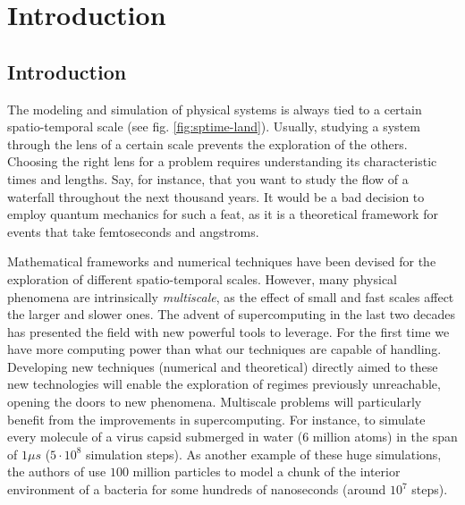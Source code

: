 \documentclass[ twoside,openright,titlepage,numbers=noenddot,%
headinclude,footinclude,cleardoublepage=empty,abstract=on,
BCOR=5mm,paper=a4,fontsize=11pt, dvipsnames
]{scrreprt}
\begin{document}
    \vspace{8ex}

    \printglossary[type=\acronymtype,nonumberlist]
\endgroup
\glsresetall
\newpage
\cleardoublepage
\pagestyle{scrheadings}
\cleardoublepage
\part{Introduction}\label{pt:intro}
\chapter{Introduction}\label{ch:introduction}

The modeling and simulation of physical systems is always tied to a certain spatio-temporal scale (see fig. \ref{fig:sptime-land}). Usually, studying a system through the lens of a certain scale prevents the exploration of the others.
Choosing the right lens for a problem requires understanding its characteristic times and lengths.
Say, for instance, that you want to study the flow of a waterfall throughout the next thousand years. It would be a bad decision to employ quantum mechanics for such a feat, as it is a theoretical framework for events that take femtoseconds and angstroms.

Mathematical frameworks and numerical techniques have been devised for the exploration of different spatio-temporal scales. However, many physical phenomena are intrinsically \emph{multiscale}, as the effect of small and fast scales affect the larger and slower ones.
The advent of supercomputing in the last two decades has presented the field with new powerful tools to leverage. For the first time we have more computing power than what our techniques are capable of handling. 
Developing new techniques (numerical and theoretical) directly aimed to these new technologies will enable the exploration of regimes previously unreachable, opening the doors to new phenomena.
Multiscale problems will particularly benefit from the improvements in supercomputing.
For instance, \cite{Hadden2018} to simulate every molecule of a virus capsid submerged in water ($6$ million atoms) in the span of $1\mu s$ ($5\cdot10^8$ simulation steps).
As another example of these huge simulations, the authors of \cite{Rochaix2019} use $100$ million particles to model a chunk of the interior environment of a bacteria for some hundreds of nanoseconds (around $10^7$ steps).
\end{document}
